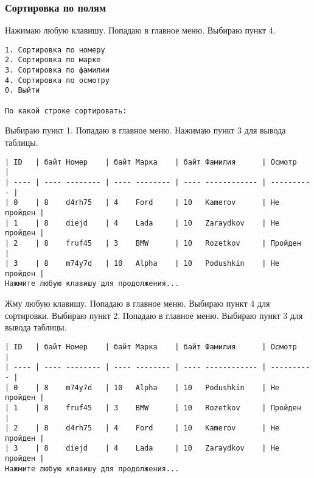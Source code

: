 \subsubsection{Сортировка по полям}

Нажимаю любую клавишу. Попадаю в главное меню. Выбираю пункт 4.

\begin{tcolorbox}
\begin{verbatim}
1. Сортировка по номеру
2. Сортировка по марке  
3. Сортировка по фамилии
4. Сортировка по осмотру
0. Выйти

По какой строке сортировать: 
\end{verbatim}
\end{tcolorbox}

Выбираю пункт 1. Попадаю в главное меню. Нажимаю пункт 3 для вывода таблицы.

\begin{tcolorbox}
\begin{verbatim}
| ID   | байт Номер    | байт Марка    | байт Фамилия      | Осмотр     |
| ---- | ---- -------- | ---- -------- | ---- ------------ | ---------- |
| 0    | 8    d4rh75   | 4    Ford     | 10   Kamerov      | Не пройден |
| 1    | 8    diejd    | 4    Lada     | 10   Zaraydkov    | Не пройден |
| 2    | 8    fruf45   | 3    BMW      | 10   Rozetkov     | Пройден    |
| 3    | 8    m74y7d   | 10   Alpha    | 10   Podushkin    | Не пройден |
Нажмите любую клавишу для продолжения...
\end{verbatim}
\end{tcolorbox}

Жму любую клавишу. Попадаю в главное меню. Выбираю пункт 4 для сортировки. Выбираю пункт 2. Попадаю в главное меню. Выбираю пункт 3 для вывода таблицы.

\begin{tcolorbox}
\begin{verbatim}
| ID   | байт Номер    | байт Марка    | байт Фамилия      | Осмотр     |
| ---- | ---- -------- | ---- -------- | ---- ------------ | ---------- |
| 0    | 8    m74y7d   | 10   Alpha    | 10   Podushkin    | Не пройден |
| 1    | 8    fruf45   | 3    BMW      | 10   Rozetkov     | Пройден    |
| 2    | 8    d4rh75   | 4    Ford     | 10   Kamerov      | Не пройден |
| 3    | 8    diejd    | 4    Lada     | 10   Zaraydkov    | Не пройден |
Нажмите любую клавишу для продолжения...
\end{verbatim}
\end{tcolorbox}

